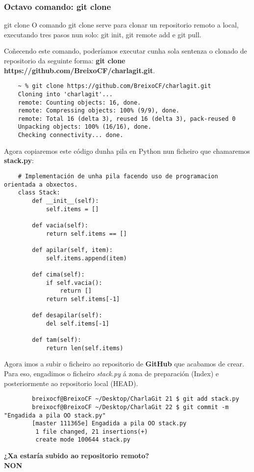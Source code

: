 \begin{frame}[fragile]
  \frametitle{Octavo comando: git clone}
  \begin{block}{git clone}
    O comando git clone serve para clonar un repositorio remoto a local, executando tres pasos nun solo: git init, git remote add e git pull.
  \end{block}
  Coñecendo este comando, poderíamos executar cunha sola sentenza o clonado de
  repositorio da seguinte forma: \textbf{git clone
    https://github.com/BreixoCF/charlagit.git}.
    \tiny
	\begin{verbatim}
	~ % git clone https://github.com/BreixoCF/charlagit.git
	Cloning into 'charlagit'...
	remote: Counting objects: 16, done.
	remote: Compressing objects: 100% (9/9), done.
	remote: Total 16 (delta 3), reused 16 (delta 3), pack-reused 0
	Unpacking objects: 100% (16/16), done.
	Checking connectivity... done.
	\end{verbatim}
\end{frame}

\begin{frame}[fragile]
  \scriptsize
  Agora copiaremos este código dunha pila en Python nun ficheiro que chamaremos \textbf{stack.py}:
  \tiny
\begin{verbatim}
	# Implementación de unha pila facendo uso de programacion orientada a obxectos.
	class Stack:
	    def __init__(self):
	        self.items = []
	
	    def vacia(self):
	        return self.items == []
	
	    def apilar(self, item):
	        self.items.append(item)
	
	    def cima(self):
	        if self.vacia():
	            return []
	        return self.items[-1]
	
	    def desapilar(self):
	        del self.items[-1]
	
	    def tam(self):
	        return len(self.items)
\end{verbatim}
\end{frame}

\begin{frame}[fragile]
  \normalsize
  Agora imos a subir o ficheiro ao repositorio de \textbf{GitHub} que acabamos de crear. Para eso, engadimos o ficheiro \textit{stack.py} á zona de preparación (Index) e posteriormente ao repositorio local (HEAD).
  \tiny 
  	\begin{verbatim}
  		breixocf@BreixoCF ~/Desktop/CharlaGit 21 $ git add stack.py 
  		breixocf@BreixoCF ~/Desktop/CharlaGit 22 $ git commit -m "Engadida a pila OO stack.py"
  		[master 111365e] Engadida a pila OO stack.py
  		 1 file changed, 21 insertions(+)
  		 create mode 100644 stack.py
  	\end{verbatim}
  \large
  \begin{center}
    \textbf{¿Xa estaría subido ao repositorio remoto?}\\
    \vspace{1cm}
    \textbf{\Huge NON}
  \end{center}
\end{frame}

